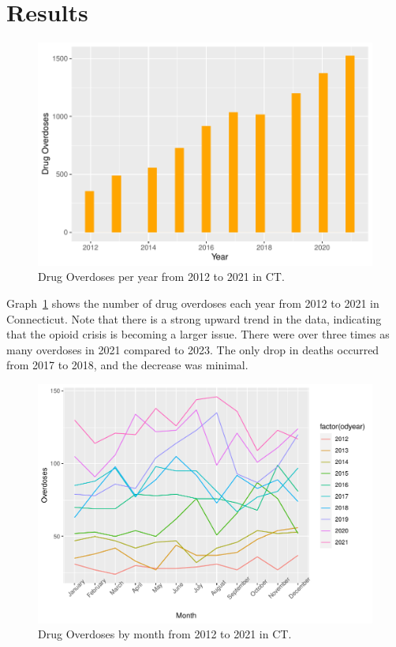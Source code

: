 \documentclass[12pt, letterpaper, titlepage]{article}
\begin{document}
\section{Results} \label{sec:Results}

\begin{figure}[tbp]
    \centering
    \includegraphics{OD_per_year}
    \caption{Drug Overdoses per year from 2012 to 2021 in CT.}
    \label{fig:OD_per_year}
  \end{figure}

Graph~\ref{fig:OD_per_year} shows the number of drug overdoses each year from 2012 to 2021 in Connecticut.  Note that there is a strong upward trend in the data, indicating that the opioid crisis is becoming a larger issue.  There were over three times as many overdoses in 2021 compared to 2023.  The only drop in deaths occurred from 2017 to 2018, and the decrease was minimal.

\begin{figure}[tbp]
    \centering
    \includegraphics{Colorline}
    \caption{Drug Overdoses by month from 2012 to 2021 in CT.}
    \label{fig:Colorline}
  \end{figure}
\end{document}
